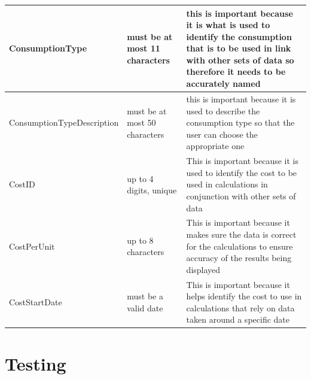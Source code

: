 \begin{center}
\begin{tabular}{|p{3cm}|p{5cm}|p{8cm}|}
        ConsumptionType & must be at most 11 characters & this is important because it is what is used to identify the consumption that is to be used in link with other sets of data so therefore it needs to be accurately named \\ \hline
        ConsumptionTypeDescription & must be at most 50 characters & this is important because it is used to describe the consumption type so that the user can choose the appropriate one \\ \hline
        CostID & up to 4 digits, unique & This is important because it is used to identify the cost to be used in calculations in conjunction with other sets of data \\ \hline
        CostPerUnit & up to 8 characters & This is important because it makes sure the data is correct for the calculations to ensure accuracy of the results being displayed \\ \hline
        CostStartDate & must be a valid date & This is important because it helps identify the cost to use in calculations that rely on data taken around a specific date  \\ \hline
    \end{tabular}
\end{center}

\section{Testing}


